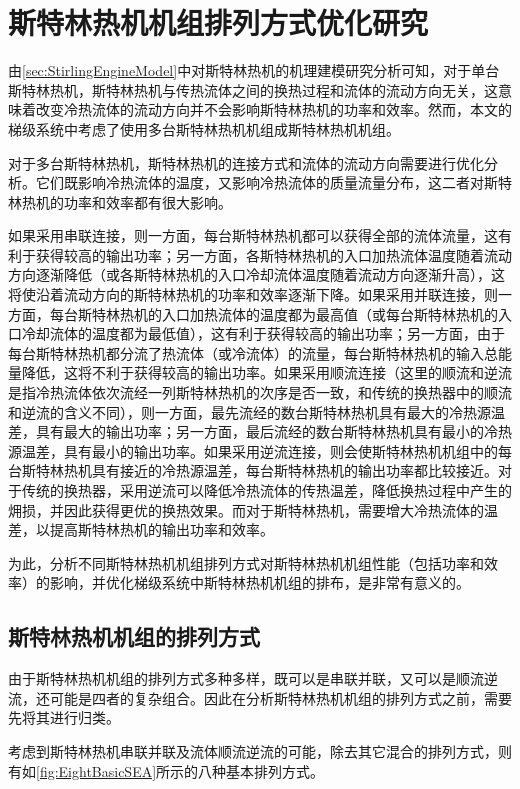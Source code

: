 \chapter{斯特林热机机组排列方式优化研究}
\label{cha:optSEA}

由\autoref{sec:StirlingEngineModel}中对斯特林热机的机理建模研究分析可知，对于单台斯特林热机，斯特林热机与传热流体之间的换热过程和流体的流动方向无关，这意味着改变冷热流体的流动方向并不会影响斯特林热机的功率和效率。然而，本文的梯级系统中考虑了使用多台斯特林热机机组成斯特林热机机组。

对于多台斯特林热机，斯特林热机的连接方式和流体的流动方向需要进行优化分析。它们既影响冷热流体的温度，又影响冷热流体的质量流量分布，这二者对斯特林热机的功率和效率都有很大影响。


如果采用串联连接，则一方面，每台斯特林热机都可以获得全部的流体流量，这有利于获得较高的输出功率；另一方面，各斯特林热机的入口加热流体温度随着流动方向逐渐降低（或各斯特林热机的入口冷却流体温度随着流动方向逐渐升高），这将使沿着流动方向的斯特林热机的功率和效率逐渐下降。如果采用并联连接，则一方面，每台斯特林热机的入口加热流体的温度都为最高值（或每台斯特林热机的入口冷却流体的温度都为最低值），这有利于获得较高的输出功率；另一方面，由于每台斯特林热机都分流了热流体（或冷流体）的流量，每台斯特林热机的输入总能量降低，这将不利于获得较高的输出功率。如果采用顺流连接（这里的顺流和逆流是指冷热流体依次流经一列斯特林热机的次序是否一致，和传统的换热器中的顺流和逆流的含义不同），则一方面，最先流经的数台斯特林热机具有最大的冷热源温差，具有最大的输出功率；另一方面，最后流经的数台斯特林热机具有最小的冷热源温差，具有最小的输出功率。如果采用逆流连接，则会使斯特林热机机组中的每台斯特林热机具有接近的冷热源温差，每台斯特林热机的输出功率都比较接近。对于传统的换热器，采用逆流可以降低冷热流体的传热温差，降低换热过程中产生的㶲损，并因此获得更优的换热效果。而对于斯特林热机，需要增大冷热流体的温差，以提高斯特林热机的输出功率和效率。


为此，分析不同斯特林热机机组排列方式对斯特林热机机组性能（包括功率和效率）的影响，并优化梯级系统中斯特林热机机组的排布，是非常有意义的。

\section{斯特林热机机组的排列方式}
\label{sec:connectionTypes}
由于斯特林热机机组的排列方式多种多样，既可以是串联并联，又可以是顺流逆流，还可能是四者的复杂组合。因此在分析斯特林热机机组的排列方式之前，需要先将其进行归类。

考虑到斯特林热机串联并联及流体顺流逆流的可能，除去其它混合的排列方式，则有如\autoref{fig:EightBasicSEA}所示的八种基本排列方式。

